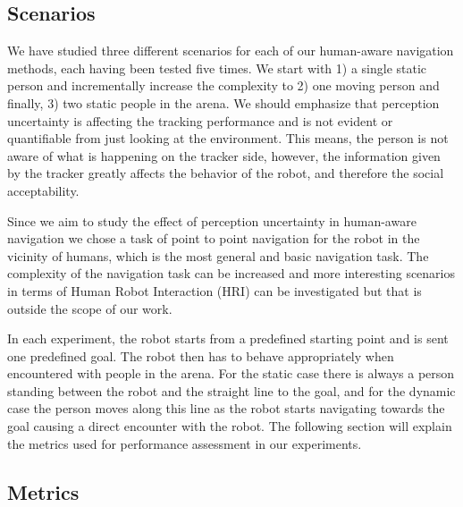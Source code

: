 \subsection{Scenarios}
\label{sec:scenarios}

We have studied three different scenarios for each of our human-aware navigation methods, each having been tested five times. We start with 1) a single static person and incrementally increase the complexity to 2) one moving person and finally, 3) two static people in the arena. We should emphasize that perception uncertainty is affecting the tracking performance and is not evident or quantifiable from just looking at the environment. This means, the person is not aware of what is happening on the tracker side, however, the information given by the tracker greatly affects the behavior of the robot, and therefore the social acceptability. 


Since we aim to study the effect of perception uncertainty in human-aware navigation we chose a task of point to point navigation for the robot in the vicinity of humans, which is the most general and basic navigation task. The complexity of the navigation task can be increased and more interesting scenarios in terms of Human Robot Interaction (HRI) can be investigated but that is outside the scope of our work. 

In each experiment, the robot starts from a predefined starting point and is sent one predefined goal. The robot then has to behave appropriately when encountered with people in the arena. For the static case there is always a person standing between the robot and the straight line to the goal, and for the dynamic case the person moves along this line as the robot starts navigating towards the goal causing a direct encounter with the robot. The following section will explain the metrics used for performance assessment in our experiments.

%




\subsection{Metrics}

